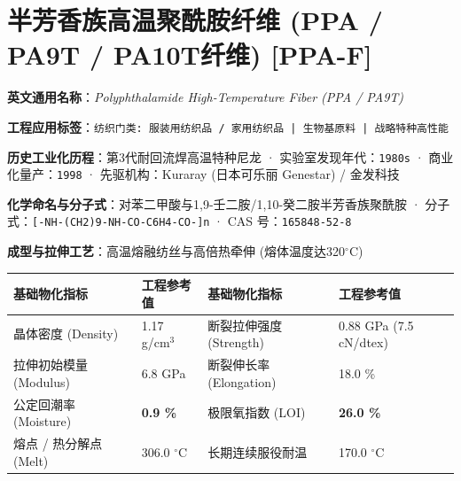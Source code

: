 \documentclass[11pt,openright,twoside,UTF8]{ctexbook}
\begin{document}
\section{半芳香族高温聚酰胺纤维 (PPA / PA9T / PA10T纤维) [PPA-F]}
\label{sec:ppa-f}

\noindent\textbf{英文通用名称}：\textit{Polyphthalamide High-Temperature Fiber (PPA / PA9T)}\par
\noindent\textbf{工程应用标签}：\texttt{纺织门类: 服装用纺织品 / 家用纺织品 | 生物基原料 | 战略特种高性能}\par
\noindent\textbf{历史工业化历程}：第3代耐回流焊高温特种尼龙 · 实验室发现年代：\texttt{1980s} · 商业化量产：\texttt{1998} · 先驱机构：Kuraray (日本可乐丽 Genestar) / 金发科技\par
\noindent\textbf{化学命名与分子式}：对苯二甲酸与1,9-壬二胺/1,10-癸二胺半芳香族聚酰胺 · 分子式：\texttt{[-NH-(CH2)9-NH-CO-C6H4-CO-]n} · CAS 号：\texttt{165848-52-8}\par
\noindent\textbf{成型与拉伸工艺}：高温熔融纺丝与高倍热牵伸 (熔体温度达320$^\circ\mathrm{C}$)\par

\vspace{0.15cm}
\begin{center}
\small
\begin{tabularx}{\textwidth}{p{3.8cm}Xp{3.8cm}X}
\toprule
\textbf{基础物化指标} & \textbf{工程参考值} & \textbf{基础物化指标} & \textbf{工程参考值} \\
\midrule
晶体密度 (Density) & 1.17 g/cm$^3$ & 断裂拉伸强度 (Strength) & 0.88 GPa (7.5 cN/dtex) \\
拉伸初始模量 (Modulus) & 6.8 GPa & 断裂伸长率 (Elongation) & 18.0 \% \\
公定回潮率 (Moisture) & \textbf{0.9 \%} & 极限氧指数 (LOI) & \textbf{26.0 \%} \\
熔点 / 热分解点 (Melt) & 306.0 $^\circ\mathrm{C}$ & 长期连续服役耐温 & 170.0 $^\circ\mathrm{C}$ \\
\bottomrule
\end{tabularx}
\end{center}
\vspace{0.15cm}
\end{document}
